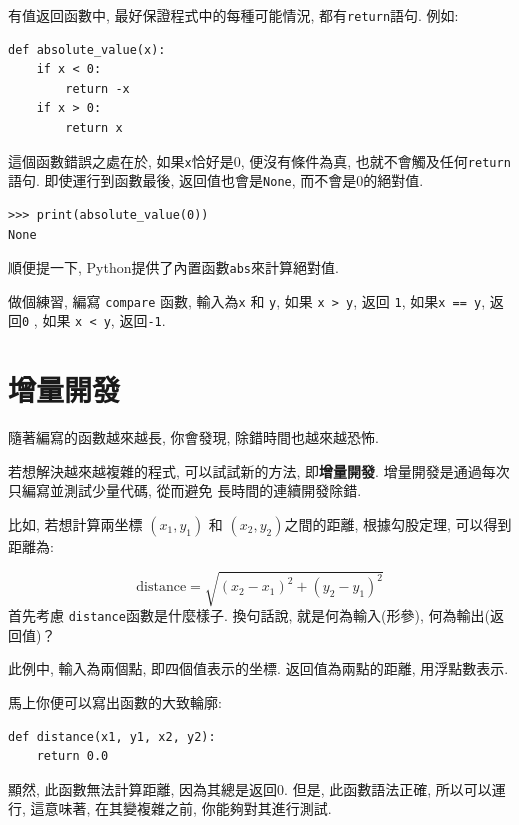 \documentclass[10pt]{book}
\begin{document}
有值返回函數中, 最好保證程式中的每種可能情況, 都有{\tt return}語句. 例如:

\begin{verbatim}
def absolute_value(x):
    if x < 0:
        return -x
    if x > 0:
        return x
\end{verbatim}
%

這個函數錯誤之處在於, 如果{\tt x}恰好是0,
便沒有條件為真, 也就不會觸及任何{\tt return}語句. 
即使運行到函數最後, 返回值也會是{\tt None}, 而不會是0的絕對值. 

\begin{verbatim}
>>> print(absolute_value(0))
None
\end{verbatim}
%
順便提一下, Python提供了內置函數{\tt abs}來計算絕對值. 

做個練習, 編寫 {\tt compare} 函數, 輸入為{\tt x} 和 {\tt y}, 
如果 {\tt x > y},  返回 {\tt 1}, 
如果{\tt x == y},  返回{\tt 0} , 
如果 {\tt x < y},  返回{\tt -1}. 


\section{增量開發}
\label{incremental.development}

隨著編寫的函數越來越長, 你會發現, 除錯時間也越來越恐怖. 

若想解決越來越複雜的程式, 可以試試新的方法, 即{\bf 增量開發}.
增量開發是通過每次只編寫並測試少量代碼, 從而避免
長時間的連續開發除錯. 

比如, 若想計算兩坐標 $(x_1, y_1)$ 和 $(x_2, y_2)$之間的距離, 
根據勾股定理, 可以得到距離為:

\begin{displaymath}
\mathrm{distance} = \sqrt{(x_2 - x_1)^2 + (y_2 - y_1)^2}
\end{displaymath}
%
首先考慮 {\tt distance}函數是什麼樣子. 換句話說, 就是何為輸入(形參), 
何為輸出(返回值)？

此例中, 輸入為兩個點, 即四個值表示的坐標. 返回值為兩點的距離, 用浮點數表示. 

馬上你便可以寫出函數的大致輪廓:

\begin{verbatim}
def distance(x1, y1, x2, y2):
    return 0.0
\end{verbatim}
%
顯然, 此函數無法計算距離, 因為其總是返回0.
但是, 此函數語法正確, 所以可以運行, 
這意味著, 在其變複雜之前, 你能夠對其進行測試. 
\end{document}
